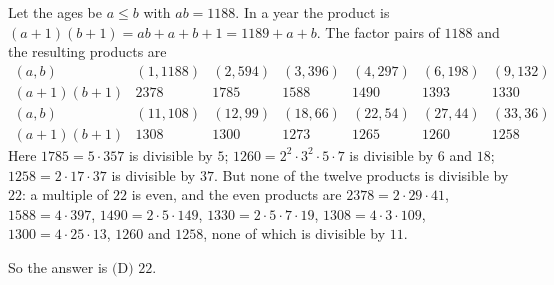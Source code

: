 Let the ages be $a\le b$ with $ab=1188$. In a year the product is $(a+1)(b+1)=ab+a+b+1=1189+a+b$. The factor pairs of $1188$ and the resulting products are
\[
\begin{array}{c|cccccccccccc}
(a,b)&(1,1188)&(2,594)&(3,396)&(4,297)&(6,198)&(9,132)\\ \hline
(a+1)(b+1)&2378&1785&1588&1490&1393&1330
\end{array}
\]
\[
\begin{array}{c|cccccc}
(a,b)&(11,108)&(12,99)&(18,66)&(22,54)&(27,44)&(33,36)\\ \hline
(a+1)(b+1)&1308&1300&1273&1265&1260&1258
\end{array}
\]
Here $1785=5\cdot357$ is divisible by $5$; $1260=2^2\cdot3^2\cdot5\cdot7$ is divisible by $6$ and $18$; $1258=2\cdot17\cdot37$ is divisible by $37$. But none of the twelve products is divisible by $22$: a multiple of $22$ is even, and the even products are $2378=2\cdot29\cdot41$, $1588=4\cdot397$, $1490=2\cdot5\cdot149$, $1330=2\cdot5\cdot7\cdot19$, $1308=4\cdot3\cdot109$, $1300=4\cdot25\cdot13$, $1260$ and $1258$, none of which is divisible by $11$.

So the answer is $\boxed{\text{(D) } 22}$.
